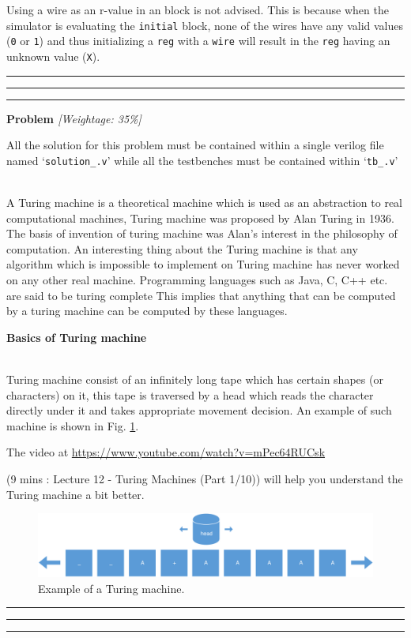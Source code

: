 \documentclass[a4paper,10pt]{article}
\theoremstyle{mytheor}
\newcounter{problemNumber}
\newcommand {
  \insertProblem}[2]{
  \vspace{0.5cm}
  \hrule \hrule \hrule
  \vspace{0.3cm}
  
  {
    \setlength{\parindent}{0}

    {
      \color{greatblue}
      \textbf{\Large{Problem \theproblemNumber}}
      \hfill
      \textit{[Weightage: #1]}
    }

    {
      \centering
      \begin{center}
        \lfseries \footnotesize All the solution for this problem
        must be contained within a single verilog file named
        `\texttt{solution\_\theproblemNumber.v}' while all the
        testbenches must be contained within
          `\texttt{tb\_\theproblemNumber.v}'
        \end{center}
      }
      
    }
    
  \vspace{6pt}\\#2

  \addtocounter{problemNumber}{1}

  \vspace{0.2cm}
  \hrule \hrule \hrule
  \vspace{0.5cm}
}
\newcommand{\problemheading}[1] {
  \vspace{0.3cm}

  {
    \setlength{\parindent}{0}
    \textbf{#1}
  }

  \vspace{0.05cm}
}
\newcounter{pitfallCount} %
\newcommand{\pitfallcounter}[1]{%
  \refstepcounter{pitfallCount}%
  \thepitfallCount%
  \label{#1}}%
\newcommand{\pitfall}[2] {
  \begin{tcolorbox}[arc=1pt,colback=yellow!10!white,colframe=orange!75!black,title=\textbf{Common Pitfall - \pitfallcounter{#1}}]
    #2
  \end{tcolorbox}
}
\newcommand{\inlinev}[1]{\lstinline[style=verilog-inline-style]{#1}}
\newcommand{\amurl}[1]{%
  {\color{blue}\url{#1}}
}
\begin{document}
\pitfall{pitfall:init-with-wire}{ Using a wire as an r-value in an
  \inilinev{initial} block is not advised. This is because when the
  simulator is evaluating the \inlinev{initial} block, none of the
  wires have any valid values (\inlinev{0} or \inlinev{1}) and thus
  initializing a \inlinev{reg} with a \inlinev{wire} will result in
  the \inlinev{reg} having an unknown value (\inlinev{X}).  }


 \insertProblem {35\%} { A Turing machine is a theoretical machine which is
   used as an abstraction to real computational machines, Turing
   machine was proposed by Alan Turing in 1936. The basis of invention
   of turing machine was Alan's interest in the philosophy of
   computation. An interesting thing about the Turing machine is that
   any algorithm which is impossible to implement on Turing machine
   has never worked on any other real machine. Programming languages
   such as Java, C, C++ etc. are said to be turing complete This
   implies that anything that can be computed by a turing machine can
   be computed by these languages.

   \problemheading{Basics of Turing machine}\\ Turing machine consist
   of an infinitely long tape which has certain shapes (or characters)
   on it, this tape is traversed by a head which reads the character
   directly under it and takes appropriate movement decision. An
   example of such machine is shown in
   Fig. \ref{Fig:turing-machine-example}.

   The video at \amurl{https://www.youtube.com/watch?v=mPec64RUCsk}
   (9 mins : Lecture 12 - Turing Machines (Part 1/10)) will help you
   understand the Turing machine a bit better.

  \begin{figure}[!h] \centering  
    \includegraphics[width=\linewidth]{./resources/turingMachine.pdf} 
    \caption{Example of a Turing machine.} 
    \label{Fig:turing-machine-example} 
  \end{figure}

}
\end{document}
